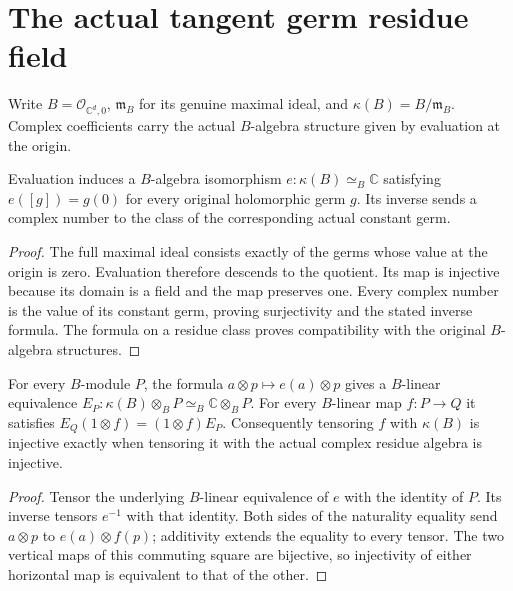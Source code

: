 \section{The actual tangent germ residue field}

Write $B=\mathcal O_{\mathbb C^d,0}$, $\mathfrak m_B$ for its genuine
maximal ideal, and $\kappa(B)=B/\mathfrak m_B$. Complex coefficients carry
the actual $B$-algebra structure given by evaluation at the origin.

\begin{theorem}
\label{hir:actual-base-residue-field}
\leanok
Evaluation induces a $B$-algebra isomorphism
$e:\kappa(B)\simeq_B\mathbb C$ satisfying $e([g])=g(0)$ for every
original holomorphic germ $g$. Its inverse sends a complex number to the
class of the corresponding actual constant germ.
\end{theorem}
\begin{proof}
The full maximal ideal consists exactly of the germs whose value at the
origin is zero. Evaluation therefore descends to the quotient. Its map
is injective because its domain is a field and the map preserves one.
Every complex number is the value of its constant germ, proving
surjectivity and the stated inverse formula. The formula on a residue
class proves compatibility with the original $B$-algebra structures.
\end{proof}

\begin{theorem}
\label{hir:actual-base-residue-tensor}
\leanok
{}
For every $B$-module $P$, the formula $a\otimes p\mapsto e(a)\otimes p$
gives a $B$-linear equivalence $E_P:\kappa(B)\otimes_B P\simeq_B
\mathbb C\otimes_B P$. For every $B$-linear map $f:P\to Q$ it satisfies
$E_Q(1\otimes f)=(1\otimes f)E_P$. Consequently tensoring $f$ with
$\kappa(B)$ is injective exactly when tensoring it with the actual
complex residue algebra is injective.
\end{theorem}
\begin{proof}
Tensor the underlying $B$-linear equivalence of $e$ with the identity of
$P$. Its inverse tensors $e^{-1}$ with that identity. Both sides of the
naturality equality send $a\otimes p$ to $e(a)\otimes f(p)$; additivity
extends the equality to every tensor. The two vertical maps of this
commuting square are bijective, so injectivity of either horizontal
map is equivalent to that of the other.
\end{proof}

